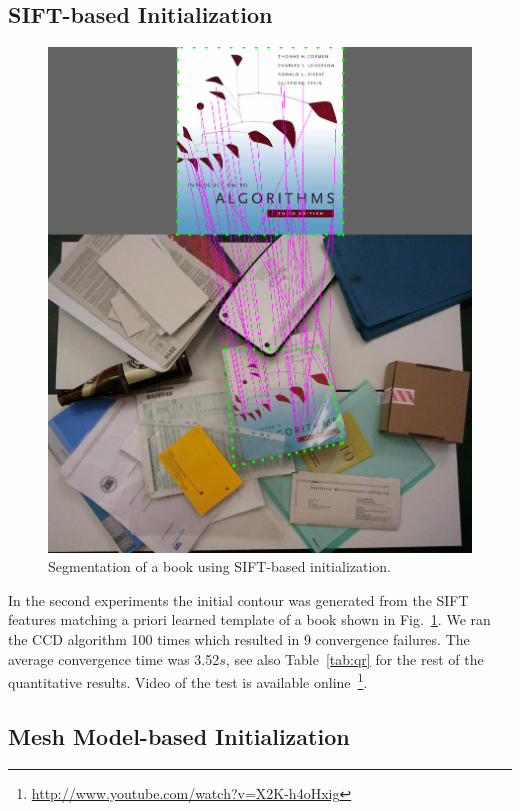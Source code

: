 \documentclass[conference]{IEEEtran}
\begin{document}
\subsection{SIFT-based Initialization}
\label{sec:sift_init}
\begin{figure}[htbp]
  \centering
  \includegraphics[width=0.8\columnwidth]{experiments/book_sift/sift_result.png}
  \caption{Segmentation of a book using SIFT-based initialization.}
  \label{fig:sift_result}
\end{figure}

In the second experiments  the initial contour was generated from the SIFT features 
matching a priori learned template of a book shown in Fig.~\ref{fig:sift_result}. 
We ran the CCD algorithm 100 times which resulted in 9 convergence failures. 
The average convergence time was 3.52$s$, see also Table~\ref{tab:qr} for the rest
of the quantitative results. Video of the test is available online~\footnote{\url{http://www.youtube.com/watch?v=X2K-h4oHxig}}.

\subsection{Mesh Model-based Initialization}
\label{sec:tifpc}

\end{document}
